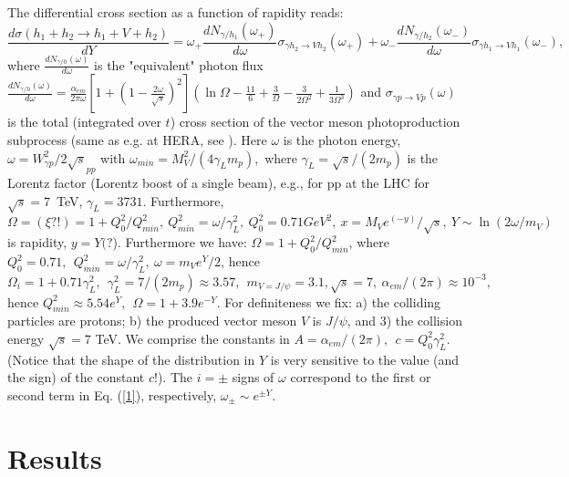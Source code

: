 \documentclass[12pt]{article}
\begin{document}
The differential cross section as a function of rapidity reads:
 \begin{equation}\label{1}
\frac{d\sigma (h_1+h_2\rightarrow h_1+V+h_2)}{dY}=\omega_+\frac{dN_{\gamma/h_1}(\omega_+)}{d\omega}\sigma_{\gamma h_2\rightarrow Vh_2}(\omega_+)+
\omega_-\frac{dN_{\gamma/h_2}(\omega_-)}{d\omega}\sigma_{\gamma h_1\rightarrow Vh_1}(\omega_-),
\end{equation}
where $\frac{dN_{\gamma/h}(\omega)}{d\omega}$ is the "equivalent" photon flux \cite{Review}
$\frac{dN_{\gamma/h}(\omega)}{d\omega}=\frac{\alpha_{em}}{2\pi\omega}[1+(1-\frac{2\omega}{\sqrt{s}})^2]
(\ln\Omega-\frac{11}{6}+\frac{3}{\Omega}-\frac{3}{2\Omega^2}+\frac{1}{3\Omega^3})$
and $\sigma_{\gamma p\rightarrow Vp}(\omega)$ is the total (integrated over $t$) cross section of the vector meson photoproduction subprocess (same as e.g. at HERA, see \cite{Capua, Fazio}). Here $\omega$ is the photon energy, $\omega=W^2_{\gamma p}/2\sqrt s_{pp}$ with
$\omega_{min}=M_V^2/(4\gamma_Lm_p),$ where $\gamma_L=\sqrt s/(2m_p)$
is the Lorentz factor (Lorentz boost of a single beam), e.g., for pp at the LHC for $\sqrt{s}=7$~TeV,
$\gamma_L=3731$.
Furthermore,
$\Omega=(\xi ?!)=1+Q_0^2/Q_{min}^2,\  Q_{min}^2=\omega/\gamma_L^2,\   Q_0^2=0.71GeV^2,\   x=M_Ve^{(-y)}/\sqrt s,\  Y\sim\ln(2\omega/m_V)$ is rapidity, $y=Y(?$).
Furthermore we have: $\Omega=1+Q^2_0/Q^2_{min}$, where $Q_0^2=0.71,\ \ Q_{min}^2=\omega/\gamma^2_L,\ \omega=m_Ve^Y/2$, hence $\Omega_i=1+0.71\gamma_L^2,\ \ \gamma_L^2=7/(2m_p)\approx 3.57, \  \
m_{V=J/\psi}=3.1, \sqrt{s}=7, \ \alpha_{em}/(2\pi)\approx 10^{-3},$ hence $Q^2_{min}\approx 5.54e^Y,\ \ \Omega=1+3.9e^{-Y}$. For definiteness we fix: a) the colliding particles are protons;
b) the produced vector meson $V$ is $J/\psi$, and 3) the collision energy $\sqrt s=7$ TeV.
We comprise the constants in $A=\alpha_{em}/(2\pi),\ \  c=Q_0^2\gamma_L^2$.
(Notice that the shape of the distribution in $Y$ is very sensitive to the value (and the sign) of the constant $c$!). The $i=\pm$ signs of $\omega$ correspond to the first or second term in Eq. (\ref{1}), respectively, $\omega_{\pm}\sim e^{\pm Y}$.

\section{Results}
\end{document}
